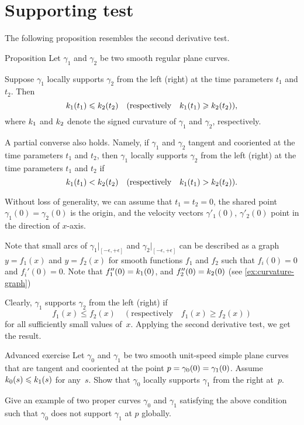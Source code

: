 \section{Supporting test}

The following proposition resembles the second derivative test. 

\begin{thm}{Proposition}\label{prop:supporting-circline}
Let $\gamma_1$ and $\gamma_2$ be two smooth regular plane curves.

Suppose $\gamma_1$ locally supports $\gamma_2$ from the left (right) at the time parameters $t_1$ and $t_2$.
Then 
\[k_1(t_1)\leqslant k_2(t_2)\quad(\text{respectively}\quad k_1(t_1)\geqslant k_2(t_2)),\]
where $k_1$ and $k_2$ denote the signed curvature of $\gamma_1$ and $\gamma_2$, respectively.

A partial converse also holds.
Namely, if $\gamma_1$ and $\gamma_2$ tangent and cooriented at the time parameters $t_1$ and $t_2$,
then $\gamma_1$ locally supports $\gamma_2$ from the left (right) at the time parameters $t_1$ and $t_2$
if 
\[k_1(t_1)< k_2(t_2)\quad(\text{respectively}\quad k_1(t_1)> k_2(t_2)).\]

\end{thm}

 Without loss of generality, we can assume that $t_1=t_2=0$, the shared point $\gamma_1(0)=\gamma_2(0)$ is the origin, and the velocity vectors $\gamma'_1(0)$, $\gamma'_2(0)$ point in the direction of $x$-axis.

Note that small arcs of $\gamma_1|_{[-\epsilon,+\epsilon]}$ and  $\gamma_2|_{[-\epsilon,+\epsilon]}$ can be described as a graph 
$y=f_1(x)$ and $y=f_2(x)$ for smooth functions $f_1$ and $f_2$ such that $f_i(0)=0$ and $f_i'(0)=0$.
Note that $f_1''(0)=k_1(0)$, and $f_2''(0)=k_2(0)$ (see \ref{ex:curvature-graph})

Clearly, $\gamma_1$ supports $\gamma_2$ from the left (right) if 
\[f_1(x)\le f_2(x)\quad(\text{respectively}\quad f_1(x)\ge f_2(x))\]
for all sufficiently small values of~$x$.
Applying the second derivative test, we get the result.
\qeds


\begin{thm}{Advanced exercise}\label{ex:support}
Let $\gamma_0$ and $\gamma_1$ be two smooth unit-speed simple plane curves that are tangent and cooriented at the point $p\z=\gamma_0(0)\z=\gamma_1(0)$.
Assume $k_0(s)\leqslant k_1(s)$ for any~$s$.
Show that $\gamma_0$ locally supports $\gamma_1$ from the right at~$p$.

Give an example of two proper curves $\gamma_0$ and $\gamma_1$ satisfying the above condition such that $\gamma_0$ does not support $\gamma_1$ at $p$ globally.
\end{thm}

